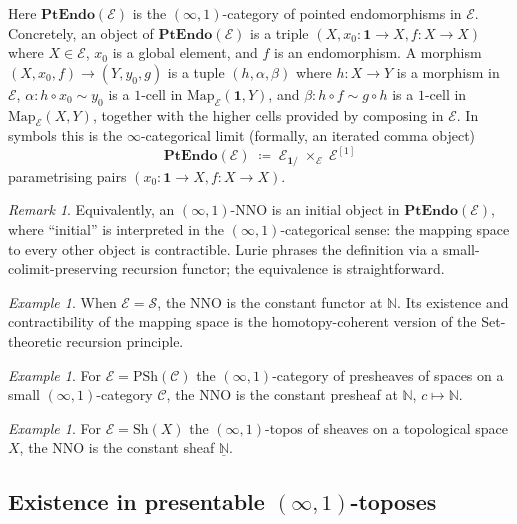 \documentclass[12pt]{article}
\theoremstyle{definition}
\theoremstyle{remark}
\newtheorem{remark}[theorem]{Remark}
\newtheorem{example}[theorem]{Example}
\newcommand{\N}{\mathbb{N}}
\newcommand{\Map}{\mathrm{Map}}
\newcommand{\PtEndo}{\mathbf{PtEndo}}
\newcommand{\Spc}{\mathcal{S}}
\begin{document}
Here $\PtEndo(\mathcal{E})$ is the $(\infty,1)$-category of pointed endomorphisms in $\mathcal{E}$. Concretely, an object of $\PtEndo(\mathcal{E})$ is a triple $(X, x_{0}\colon \mathbf{1}\to X, f\colon X\to X)$ where $X\in\mathcal{E}$, $x_{0}$ is a global element, and $f$ is an endomorphism. A morphism $(X,x_{0},f)\to(Y,y_{0},g)$ is a tuple $(h, \alpha, \beta)$ where $h\colon X\to Y$ is a morphism in $\mathcal{E}$, $\alpha\colon h\circ x_{0}\sim y_{0}$ is a $1$-cell in $\Map_{\mathcal{E}}(\mathbf{1},Y)$, and $\beta\colon h\circ f\sim g\circ h$ is a $1$-cell in $\Map_{\mathcal{E}}(X,Y)$, together with the higher cells provided by composing in $\mathcal{E}$. In symbols this is the $\infty$-categorical limit (formally, an iterated comma object)
\[
\PtEndo(\mathcal{E}) \;\coloneqq\; \mathcal{E}_{\mathbf{1}/}\;\times_{\mathcal{E}}\; \mathcal{E}^{[1]}
\]
parametrising pairs $(x_{0}\colon \mathbf{1}\to X, f\colon X\to X)$.

\begin{remark}
Equivalently, an $(\infty,1)$-NNO is an initial object in $\PtEndo(\mathcal{E})$, where ``initial'' is interpreted in the $(\infty,1)$-categorical sense: the mapping space to every other object is contractible. Lurie phrases the definition via a small-colimit-preserving recursion functor; the equivalence is straightforward.
\end{remark}

\begin{example}
When $\mathcal{E}=\Spc$, the NNO is the constant functor at $\N$. Its existence and contractibility of the mapping space is the homotopy-coherent version of the Set-theoretic recursion principle.
\end{example}

\begin{example}
For $\mathcal{E}=\mathrm{PSh}(\mathcal{C})$ the $(\infty,1)$-category of presheaves of spaces on a small $(\infty,1)$-category $\mathcal{C}$, the NNO is the constant presheaf at $\N$, $c\mapsto \N$.
\end{example}

\begin{example}
For $\mathcal{E}=\mathrm{Sh}(X)$ the $(\infty,1)$-topos of sheaves on a topological space $X$, the NNO is the constant sheaf $\underline{\N}$.
\end{example}

\subsection{Existence in presentable \texorpdfstring{$(\infty,1)$}{(infinity,1)}-toposes}
\end{document}
